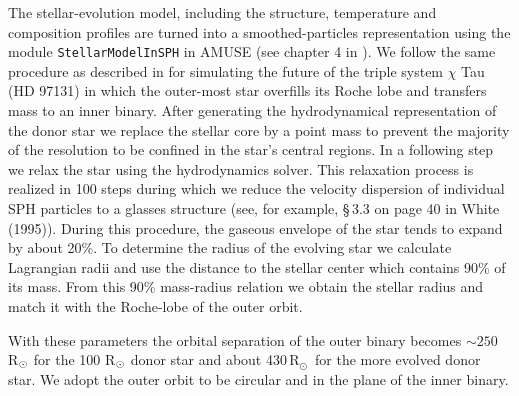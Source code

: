 \documentclass[twocolumn]{aastex62}
\newcommand{\MSun}{\mbox{M$_\odot$}}
\newcommand{\RSun}{\mbox{R$_\odot$}}
\begin{document}
The stellar-evolution model, including the structure, temperature and
composition profiles are turned into a smoothed-particles
representation using the module {\tt StellarModelInSPH} in AMUSE (see
chapter 4 in \cite{AMUSE}).  We follow the same procedure as described
in \cite{2014MNRAS.438.1909D} for simulating the future of the triple
system $\chi$ Tau (HD 97131) in which the outer-most star overfills
its Roche lobe and transfers mass to an inner binary.  After
generating the hydrodynamical representation of the donor star we
replace the stellar core by a point mass to prevent the majority of
the resolution to be confined in the star's central regions.  In a
following step we relax the star using the hydrodynamics solver. This
relaxation process is realized in 100 steps during which we reduce the
velocity dispersion of individual SPH particles to a glasses structure 
(see, for example, \S\,3.3 on page 40 in White (1995)).  During this procedure, the gaseous
envelope of the star tends to expand by about 20\%.  To determine the
radius of the evolving star we calculate Lagrangian radii and use the
distance to the stellar center which contains 90\% of its mass. From
this 90\% mass-radius relation we obtain the stellar radius and match
it with the Roche-lobe of the outer orbit.

With these parameters the orbital separation of the outer binary
becomes $\sim 250$ R$_{\rm \odot}$ for the 100 R$_{\rm \odot}$ donor star and about
430\,\RSun\, for the more evolved donor star.  We adopt the outer
orbit to be circular and in the plane of the inner binary.

\end{document}
